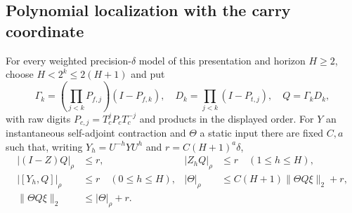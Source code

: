 \subsection{Polynomial localization with the carry coordinate}
\begin{theorem}\label{thm:profile-interface}
For every weighted precision-$\delta$ model of this presentation and horizon $H\ge2$, choose $H<2^k\le2(H+1)$ and put
\[
 \Gamma_k=\left(\prod_{j<k}P_{f,j}\right)(I-P_{f,k}),\quad
 D_k=\prod_{j<k}(I-P_{t,j}),\quad Q=\Gamma_kD_k,
\]
with raw digits $P_{c,j}=T_c^jP_cT_c^{-j}$ and products in the displayed order. For $Y$ an instantaneous self-adjoint contraction and $\Theta$ a static input there are fixed $C,a$ such that, writing $Y_h=U^{-h}YU^h$ and $r=C(H+1)^a\delta$,
\begin{align*}
 |(I-Z)Q|_\rho&\le r,&|Z_hQ|_\rho&\le r\quad(1\le h\le H),\\
 |[Y_h,Q]|_\rho&\le r\quad(0\le h\le H),&
 |\Theta|_\rho&\le C(H+1)\|\Theta Q\xi\|_2+r,\\
 \|\Theta Q\xi\|_2&\le|\Theta|_\rho+r.
\end{align*}
\end{theorem}
